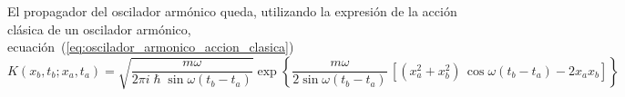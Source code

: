 El propagador del oscilador armónico queda, utilizando la expresión de
la acción clásica de un oscilador armónico,
ecuación~(\ref{eq:oscilador_armonico_accion_clasica})
{\small
  \begin{equation}\label{eq:propagador_oscilador_armonico}
    K(x_b,t_b;x_a,t_a) =
      \sqrt{
    \dfrac{m\omega}
    {
    2\pi i\hslash\sin\omega(t_b-t_a)}
    }    
  \exp\left\{
    \dfrac{m\omega}
    {2\sin\omega(t_b-t_a)}\,
    \left[(x_a^2+x_b^2)\,\cos\omega(t_b-t_a) - 2x_ax_b\right]
  \right\}
\end{equation}
}



